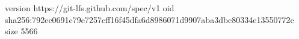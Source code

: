 version https://git-lfs.github.com/spec/v1
oid sha256:792ec0691c79e7257cff16f45dfa6d8986071d9907aba3dbc80334e13550772c
size 5566
